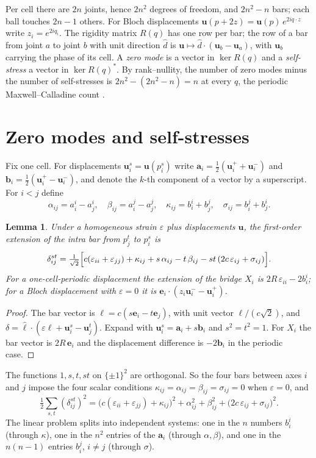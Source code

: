 \documentclass[11pt]{amsart}
\newtheorem{lemma}{Lemma}
\theoremstyle{definition}
\theoremstyle{remark}
\newcommand{\e}{\mathbf{e}}
\newcommand{\vu}{\mathbf{u}}
\newcommand{\va}{\mathbf{a}}
\newcommand{\vb}{\mathbf{b}}
\begin{document}
Per cell there are $2n$ joints, hence $2n^2$ degrees of freedom, and $2n^2-n$ bars; each ball touches $2n-1$ others. For Bloch displacements $\vu(p+2z)=\vu(p)\,e^{2i q\cdot z}$ write $z_i=e^{2iq_i}$. The rigidity matrix $R(q)$ has one row per bar; the row of a bar from joint $a$ to joint $b$ with unit direction $\hat d$ is $\vu\mapsto \hat d\cdot(\vu_b-\vu_a)$, with $\vu_b$ carrying the phase of its cell. A \emph{zero mode} is a vector in $\ker R(q)$ and a \emph{self-stress} a vector in $\ker R(q)^*$. By rank--nullity, the number of zero modes minus the number of self-stresses is $2n^2-(2n^2-n)=n$ at every $q$, the periodic Maxwell--Calladine count \cite{Maxwell1864,Calladine1978,Power2014}.

\section{Zero modes and self-stresses}\label{sec:counts}

Fix one cell. For displacements $\vu_i^s=\vu(p_i^s)$ write $\va_i=\tfrac12(\vu_i^++\vu_i^-)$ and $\vb_i=\tfrac12(\vu_i^+-\vu_i^-)$, and denote the $k$-th component of a vector by a superscript. For $i<j$ define
\[
\alpha_{ij}=a_i^i-a_j^i,\quad \beta_{ij}=a_i^j-a_j^j,\quad \kappa_{ij}=b_i^i+b_j^j,\quad \sigma_{ij}=b_i^j+b_j^i .
\]

\begin{lemma}\label{lem:block}
Under a homogeneous strain $\varepsilon$ plus displacements $\vu$, the first-order extension of the intra bar from $p_j^t$ to $p_i^s$ is
\begin{equation}\label{eq:ext}
\delta_{ij}^{st}=\tfrac{1}{\sqrt2}\Bigl[c(\varepsilon_{ii}+\varepsilon_{jj})+\kappa_{ij}+s\,\alpha_{ij}-t\,\beta_{ij}-st\,(2c\,\varepsilon_{ij}+\sigma_{ij})\Bigr].
\end{equation}
For a one-cell-periodic displacement the extension of the bridge $X_i$ is $2R\,\varepsilon_{ii}-2b_i^i$; for a Bloch displacement with $\varepsilon=0$ it is $\e_i\cdot(z_i\vu_i^--\vu_i^+)$.
\end{lemma}

\begin{proof}
The bar vector is $\ell=c(s\e_i-t\e_j)$, with unit vector $\ell/(c\sqrt2)$, and $\delta=\hat\ell\cdot(\varepsilon\ell+\vu_i^s-\vu_j^t)$. Expand with $\vu_i^s=\va_i+s\vb_i$ and $s^2=t^2=1$. For $X_i$ the bar vector is $2R\,\e_i$ and the displacement difference is $-2\vb_i$ in the periodic case.
\end{proof}

The functions $1,s,t,st$ on $\{\pm1\}^2$ are orthogonal. So the four bars between axes $i$ and $j$ impose the four scalar conditions $\kappa_{ij}=\alpha_{ij}=\beta_{ij}=\sigma_{ij}=0$ when $\varepsilon=0$, and
\begin{equation}\label{eq:sum}
\tfrac12\sum_{s,t}(\delta_{ij}^{st})^2=\bigl(c(\varepsilon_{ii}+\varepsilon_{jj})+\kappa_{ij}\bigr)^2+\alpha_{ij}^2+\beta_{ij}^2+\bigl(2c\,\varepsilon_{ij}+\sigma_{ij}\bigr)^2 .
\end{equation}
The linear problem splits into independent systems: one in the $n$ numbers $b_i^i$ (through $\kappa$), one in the $n^2$ entries of the $\va_i$ (through $\alpha,\beta$), and one in the $n(n-1)$ entries $b_i^j$, $i\ne j$ (through $\sigma$).
\end{document}
